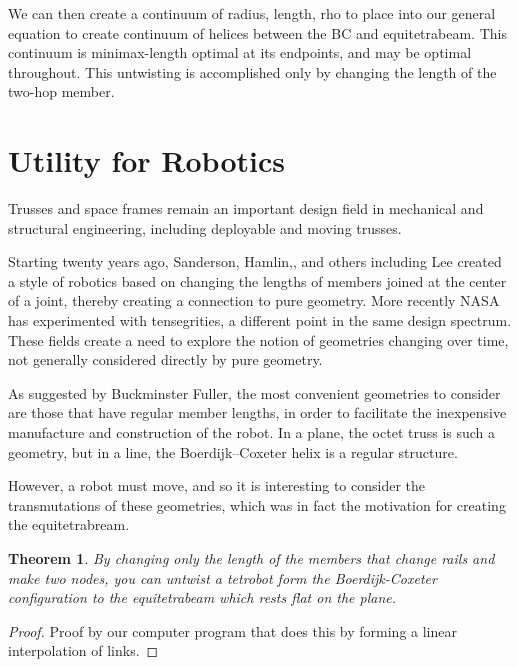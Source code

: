 \documentclass[11pt]{article}
\newtheorem{theorem}{Theorem}
\begin{document}
We can then create a continuum of radius, length, rho to place into our general equation
to create continuum of helices between the BC and equitetrabeam. This continuum is 
minimax-length optimal at its endpoints, and may be optimal throughout. This untwisting is accomplished
only by changing the length of the two-hop member.

\section{Utility for Robotics}

Trusses and space frames remain an important design field in mechanical and structural engineering\cite{mikulas1985sequentially},
including deployable and moving trusses\cite{claypool2012readily}.

Starting twenty years ago, Sanderson\cite{sanderson1996modular}, Hamlin,\cite{TetrobotBook}, and others including Lee\cite{lee2002dynamic}
created a style of robotics based on changing the lengths of members
joined at the center of a joint, thereby creating a connection to pure geometry. More recently NASA has experimented with
tensegrities\cite{NTRT}, a different point in the same design spectrum. These fields create a need to explore the notion of
geometries changing over time, not generally considered directly by pure geometry.

As suggested by Buckminster Fuller, the most convenient geometries to consider are those that have regular member
lengths, in order to facilitate the inexpensive manufacture and construction of the robot.  In a plane, the octet truss
is such a geometry, but in a line, the Boerdijk--Coxeter helix is a regular structure.

However, a robot must move, and so it is interesting to consider the transmutations of these geometries, which was in
fact the motivation for creating the equitetrabream.

\begin{theorem}
  By changing only the length of the members that change rails and make two nodes, you can untwist a tetrobot
  form the Boerdijk-Coxeter configuration to the equitetrabeam which rests flat on the plane.
\end{theorem}

\begin{proof}
  Proof by our computer program that does this by forming a linear interpolation of links.
\end{proof}
\end{document}
